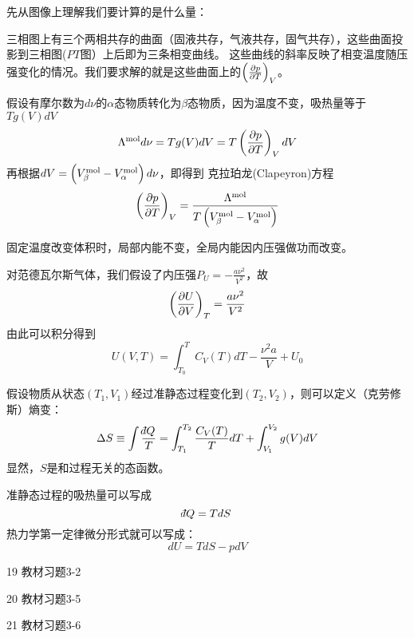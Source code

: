 \documentclass[CJK]{beamer}
\begin{document}
\begin{frame}
\bch
先从图像上理解我们要计算的是什么量：

\hspace{0.1in}

三相图上有三个两相共存的曲面（固液共存，气液共存，固气共存），这些曲面投影到三相图($PT$图）上后即为三条相变曲线。
这些曲线的斜率反映了相变温度随压强变化的情况。我们要求解的就是这些曲面上的$\left(\frac{\partial p}{\partial T}\right)_{V}$。
\ech
\end{frame}


\begin{frame}
\bch
假设有摩尔数为$d\nu$的$\alpha$态物质转化为$\beta$态物质，因为温度不变，吸热量等于$Tg(V)dV$
$$ \Lambda^{\rm mol} d\nu = Tg(V)dV = T\left(\frac{\partial p}{\partial T}\right)_{V} dV $$
再根据$dV = \left(V_\beta^{\rm mol} - V_\alpha^{\rm mol}\right)d\nu$，即得到
{\blue 克拉珀龙(Clapeyron)方程
$$ \left(\frac{\partial p}{\partial T}\right)_{V} = \frac{\Lambda^{\rm mol}}{T\left(V_\beta^{\rm mol} - V_\alpha^{\rm mol}\right)}$$}
\ech
\end{frame}


\begin{frame}
\bch
{\small
固定温度改变体积时，局部内能不变，全局内能因内压强做功而改变。

对范德瓦尔斯气体，我们假设了内压强$P_U = -\frac{a\nu^2}{V^2}$，故
$$\left(\frac{\partial U}{\partial V}\right)_{T} = \frac{a\nu^2}{V^2}$$
由此可以积分得到
$$U(V, T) = \int_{T_0}^T C_V(T) dT -\frac{\nu^2a}{V} + U_0$$
}
\ech
\end{frame}

\begin{frame}
\bch
假设物质从状态$(T_1, V_1)$经过准静态过程变化到$(T_2, V_2)$，则可以定义{\blue（克劳修斯）熵变：
$$ \Delta S \equiv \int\frac{\dbar Q}{T} = \int_{T_1}^{T_2} \frac{C_V(T)}{T}dT + \int_{V_1}^{V_2} g(V)dV$$}
显然，{\blue $S$是和过程无关的态函数}。

准静态过程的吸热量可以写成
$$ \dbar Q  = T dS$$
热力学第一定律微分形式就可以写成：
{\blue $$ dU = TdS - pdV$$}
\ech
\end{frame}


\begin{frame}
\bch


\ech
\end{frame}


\begin{frame}
\bch
\bitem
\item[19]{教材习题3-2}
\item[20]{教材习题3-5}
\item[21]{教材习题3-6}
\eitem
\ech
\end{frame}
\end{document}
